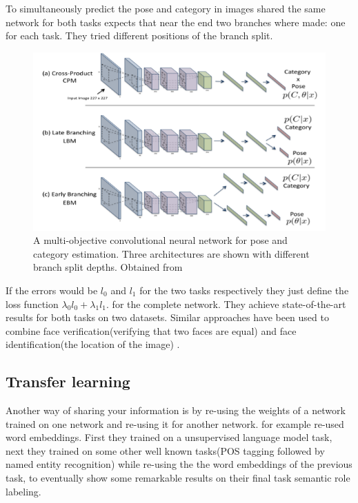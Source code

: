 \documentclass[a4paper]{scrartcl}
\begin{document}
 To simultaneously predict the pose and category in images   shared the same network for both tasks expects that near the end two branches where made: one for each task. They tried different positions of the branch split. 
\begin{figure}[h]
\centering
\includegraphics[scale=.5]{multitask.png}
\caption{A multi-objective convolutional neural network for pose and category estimation. Three architectures are shown with different branch split depths. Obtained from \cite{elhoseiny2015convolutional}}
\label{fig:mutliobj}
\end{figure}
If the errors would be $l_0$ and $l_1$ for the two tasks respectively they just define the loss function $\lambda_0 l_0 + \lambda_1 l_1$. for the complete network. They achieve state-of-the-art results for both tasks on two datasets. Similar approaches have been used to combine face verification(verifying that two faces are equal) and face identification(the location of the image) \cite{sun2014deep}. 
\subsection{Transfer learning}
Another way of sharing your information is by re-using the weights of a network trained on one network and re-using it for another network.  for example re-used word embeddings. First they trained on a unsupervised language model task, next they trained on some other well known tasks(POS tagging followed by named entity recognition) while re-using the the word embeddings of the previous task, to eventually show some remarkable results on their final task semantic role labeling.
\end{document}

